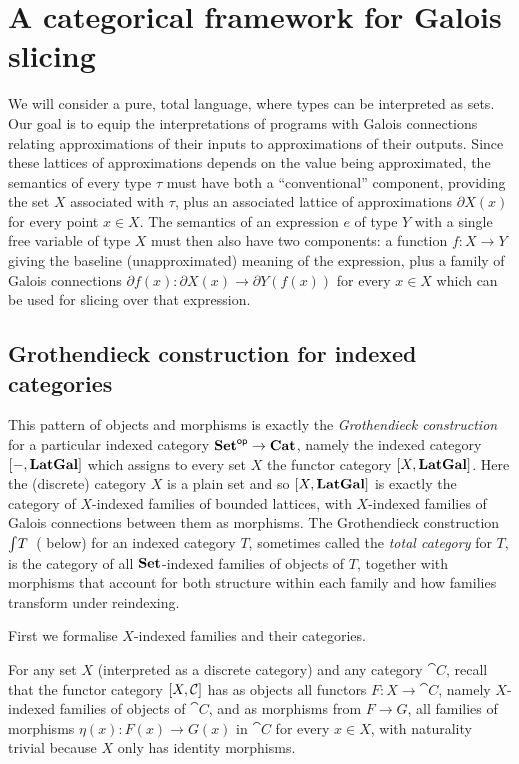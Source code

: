 \section{A categorical framework for Galois slicing}

We will consider a pure, total language, where types can be interpreted as sets. Our goal is to equip the
interpretations of programs with Galois connections relating approximations of their inputs to approximations
of their outputs. Since these lattices of approximations depends on the value being approximated, the
semantics of every type $\tau$ must have both a ``conventional'' component, providing the set $X$ associated
with $\tau$, plus an associated lattice of approximations $\partial X(x)$ for every point $x \in X$. The
semantics of an expression $e$ of type $Y$ with a single free variable of type $X$ must then also have two
components: a function $f: X \to Y$ giving the baseline (unapproximated) meaning of the expression, plus a
family of Galois connections $\partial f(x): \partial X(x) \to \partial Y(f(x))$ for every $x \in X$ which can
be used for slicing over that expression.

\subsection{Grothendieck construction for indexed categories}
\label{sec:Grothendieck}

This pattern of objects and morphisms is exactly the \emph{Grothendieck construction} for a particular indexed
category $\mathbf{Set}^{\mathsf{op}} \to \mathbf{Cat}$, namely the indexed category $[-,\mathbf{LatGal}]$ which assigns to every set $X$
the functor category $[X,\mathbf{LatGal}]$. Here the (discrete) category $X$ is a plain set and so
$[X,\mathbf{LatGal}]$ is exactly the category of $X$-indexed families of bounded lattices, with $X$-indexed
families of Galois connections between them as morphisms. The Grothendieck construction
$\int_{}T$~( below) for an indexed category $T$, sometimes called the \emph{total
category} for $T$, is the category of all $\mathbf{Set}$-indexed families of objects of $T$, together with morphisms
that account for both structure within each family and how families transform under reindexing.

First we formalise $X$-indexed families and their categories.

\begin{definition}
For any set $X$ (interpreted as a discrete category) and any category $\cat{C}$, recall that the functor
category $[X,\mathcal{C}]$ has as objects all functors $F: X \to \cat{C}$, namely $X$-indexed families of
objects of $\cat{C}$, and as morphisms from $F \to G$, all families of morphisms $\eta(x): F(x) \to G(x)$ in
$\cat{C}$ for every $x \in X$, with naturality trivial because $X$ only has identity morphisms.
\end{definition}

